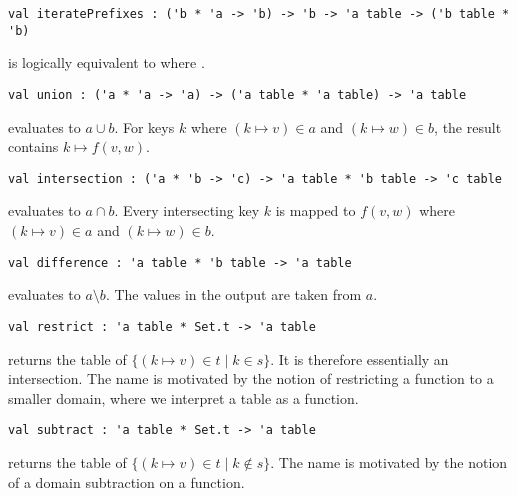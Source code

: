 \begin{gram}[iteratePrefixes]
\begin{verbatim}
val iteratePrefixes : ('b * 'a -> 'b) -> 'b -> 'a table -> ('b table * 'b)
\end{verbatim}
 is logically equivalent to
 where .
\end{gram}

\begin{gram}[union]
\begin{verbatim}
val union : ('a * 'a -> 'a) -> ('a table * 'a table) -> 'a table
\end{verbatim}
 evaluates to $a \cup b$. For keys $k$ where $(k \mapsto v) \in a$
and $(k \mapsto w) \in b$, the result contains $k \mapsto f(v,w)$.
\end{gram}

\begin{gram}[intersection]
\begin{verbatim}
val intersection : ('a * 'b -> 'c) -> 'a table * 'b table -> 'c table
\end{verbatim}
 evaluates to $a \cap b$. Every intersecting key
$k$ is mapped to $f(v,w)$ where $(k \mapsto v) \in a$ and $(k \mapsto w) \in b$.
\end{gram}

\begin{gram}[difference]
\begin{verbatim}
val difference : 'a table * 'b table -> 'a table
\end{verbatim}
 evaluates to $a \setminus b$. The values in the output
are taken from $a$.
\end{gram}

\begin{gram}[restrict]
\begin{verbatim}
val restrict : 'a table * Set.t -> 'a table
\end{verbatim}
 returns the table of $\{(k \mapsto v) \in t \mathbin| k \in s\}$.
It is therefore essentially an intersection. The name is motivated by the
notion of restricting a function to a smaller domain, where we interpret a table
as a function.
\end{gram}

\begin{gram}[subtract]
\begin{verbatim}
val subtract : 'a table * Set.t -> 'a table
\end{verbatim}
 returns the table of
$\{(k \mapsto v) \in t \mathbin| k \not\in s\}$.
The name is motivated by the notion of a domain subtraction on a function.
\end{gram}


